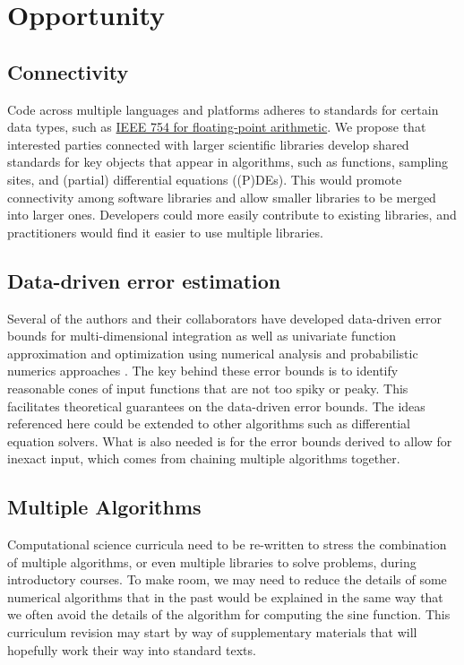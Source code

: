 \documentclass{amsart}
\begin{document}
\section{Opportunity} %
\subsection{Connectivity} 
Code across multiple languages and platforms adheres to standards for certain data types, such as \href{https://en.wikipedia.org/wiki/IEEE_754}{IEEE 754 for floating-point arithmetic}.  We propose that interested parties connected with larger scientific libraries develop shared standards for key objects that appear in algorithms, such as functions, sampling sites, and (partial) differential equations ((P)DEs). This would promote connectivity among software libraries and allow smaller libraries to be merged into larger ones.  Developers could more easily contribute to existing libraries, and practitioners would find it easier to use multiple libraries.

\subsection{Data-driven error estimation} 
Several of the authors and their collaborators have developed data-driven error bounds for multi-dimensional integration as well as univariate function approximation and optimization using numerical analysis and probabilistic numerics approaches \cite{ChoEtal17a, HicEtal14b, HicEtal14a, HicJim16a, RatHic19a,JimHic16a}.  The key behind these error bounds is to identify reasonable cones of input functions that are not too spiky or peaky.  This facilitates theoretical guarantees on the data-driven error bounds.  The ideas referenced here could be extended to other algorithms such as differential equation solvers.  What is also needed is for the error bounds derived to allow for inexact input, which comes from chaining multiple algorithms together.

\subsection{Multiple Algorithms}
Computational science curricula need to be re-written to stress the combination of multiple algorithms, or even multiple libraries to solve problems, during introductory courses.  To make room, we may need to reduce the details of some numerical algorithms that in the past would be explained in the same way that we often avoid the details of the algorithm for computing the sine function.  This curriculum revision may start by way of supplementary materials that will hopefully work their way into standard texts.
\end{document}
